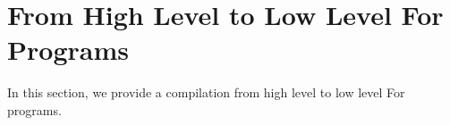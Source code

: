 \section{From High Level to Low Level For Programs}
\label{sec:htl}

In this section, we provide a compilation from
high level to low level For programs.

